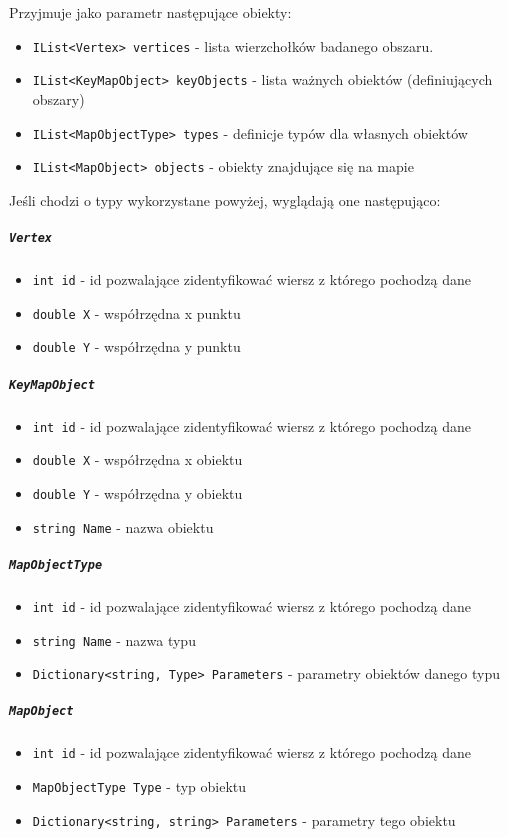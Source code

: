 \documentclass[a4paper, 10pt, titlepage]{article}
\newcommand{\code}[1]{\texttt{#1}}
\begin{document}
Przyjmuje jako parametr następujące obiekty:
\begin{itemize}
\item \code{IList<Vertex> vertices} - lista wierzchołków badanego obszaru.
\item \code{IList<KeyMapObject> keyObjects} - lista ważnych obiektów (definiujących obszary)
\item \code{IList<MapObjectType> types} - definicje typów dla własnych obiektów
\item \code{IList<MapObject> objects} - obiekty znajdujące się na mapie
\end{itemize}

Jeśli chodzi o typy wykorzystane powyżej, wyglądają one następująco:

\subparagraph{\code{Vertex}}
\begin{itemize}
\item \code{int id} - id pozwalające zidentyfikować wiersz z którego pochodzą dane
\item \code{double X} - współrzędna x punktu
\item \code{double Y} - współrzędna y punktu
\end{itemize}

\subparagraph{\code{KeyMapObject}}
\begin{itemize}
\item \code{int id} - id pozwalające zidentyfikować wiersz z którego pochodzą dane
\item \code{double X} - współrzędna x obiektu
\item \code{double Y} - współrzędna y obiektu
\item \code{string Name} - nazwa obiektu
\end{itemize}

\subparagraph{\code{MapObjectType}}
\begin{itemize}
\item \code{int id} - id pozwalające zidentyfikować wiersz z którego pochodzą dane
\item \code{string Name} - nazwa typu
\item \code{Dictionary<string, Type> Parameters} - parametry obiektów danego typu
\end{itemize}

\subparagraph{\code{MapObject}}
\begin{itemize}
\item \code{int id} - id pozwalające zidentyfikować wiersz z którego pochodzą dane
\item \code{MapObjectType Type} - typ obiektu
\item \code{Dictionary<string, string> Parameters} - parametry tego obiektu
\end{itemize}
\end{document}
